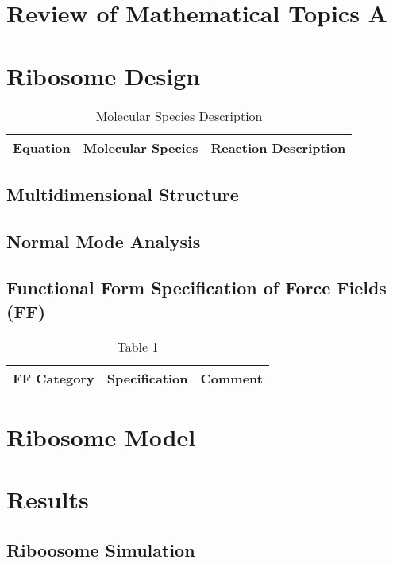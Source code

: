 \section{Review of Mathematical Topics A}


\section{Ribosome Design}

\begin{table}[H]
\centering
\begin{tabular}{rll}
Equation & Molecular Species & Reaction Description\\ 
\hline
\hline
\end{tabular}
\caption{Molecular Species Description}
\end{table}


\subsection{Multidimensional Structure}

\subsection{Normal Mode Analysis}

\subsection{Functional Form Specification of Force Fields (FF)}

\begin{table}[H]
\caption{Table 1}
\tiny
\begin{tabular}{p{1cm}p{5cm}p{2cm}}
\hline
FF Category  & Specification & Comment  \\
\hline
\hline
\end{tabular}
\end{table}

\section{Ribosome Model}


\section{Results}

\subsection{Riboosome Simulation}


